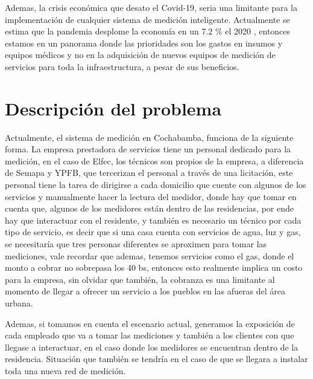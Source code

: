 Ademas, la crisis económica que desato el Covid-19, seria una limitante para la implementación de cualquier sistema 
de medición inteligente. Actualmente se estima que la pandemia desplome la economía en un 7.2 \% el 2020 \cite{bancomundial}, 
entonces estamos en un panorama donde las prioridades son los gastos en insumos y equipos médicos 
y no en la adquisición de nuevos equipos de medición de servicios para toda la infraestructura, a pesar de sus beneficios.

\section{Descripción del problema}
Actualmente, el sistema de medición en Cochabamba, funciona de la siguiente forma. La empresa prestadora de
servicios tiene un personal dedicado para la medición, en el caso de Elfec, los técnicos son propios de la
empresa, a diferencia de Semapa y YPFB, que tercerizan el personal a través de una licitación, este personal
tiene la tarea de dirigirse a cada domicilio que cuente con algunos de los servicios y manualmente hacer la
lectura del medidor, donde hay que tomar en cuenta que, algunos de los medidores están dentro de las
residencias, por ende hay que interactuar con el residente, y también es necesario un técnico por cada tipo de
servicio, es decir que si una casa cuenta con servicios de agua, luz y gas, se necesitaría que tres personas
diferentes se aproximen para tomar las mediciones, vale recordar que ademas, tenemos servicios como el gas, 
donde el monto a cobrar no sobrepasa los 40 bs, entonces esto realmente implica un costo para la empresa, sin
olvidar que también, la cobranza es una limitante al momento de llegar a ofrecer un servicio a los pueblos en
las afueras del área urbana.

Ademas, si tomamos en cuenta el escenario actual, generamos la exposición de cada empleado que va a tomar las
mediciones y también a los clientes con que llegase a interactuar, en el caso donde los medidores se encuentran
dentro de la residencia. Situación que también se tendría en el caso de que se llegara a instalar toda una
nueva red de medición.

